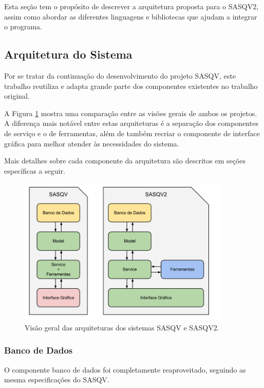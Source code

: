 Esta seção tem o propósito de descrever a arquitetura proposta para o SASQV2, assim como abordar as diferentes linguagens e bibliotecas que ajudam a integrar o programa.

\subsection{Arquitetura do Sistema}

Por se tratar da continuação do desenvolvimento do projeto SASQV, este trabalho reutiliza e adapta grande parte dos componentes existentes no trabalho original.

A Figura \ref{fig:arquitetura} mostra uma comparação entre as visões gerais de ambos os projetos. A diferença mais notável entre estas arquiteturas é a separação dos componentes de serviço e o de ferramentas, além de também recriar o componente de interface gráfica para melhor atender às necessidades do sistema.

Mais detalhes sobre cada componente da arquitetura são descritos em seções específicas a seguir.

\begin{figure}[!htb]
	\centering
	\includegraphics[width=0.9\textwidth]{./imgs/arquitetura.png}
	\caption{Visão geral das arquiteturas dos sistemas SASQV e SASQV2.}
	\label{fig:arquitetura}
\end{figure}

\subsubsection{Banco de Dados}

O componente banco de dados foi completamente reaproveitado, seguindo as mesma especificações do SASQV.

